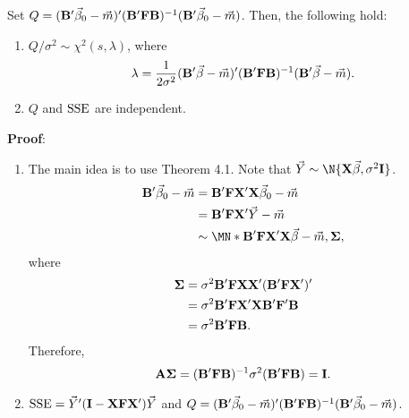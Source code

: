 \begin{Theorem}{}{}
    Set $ Q=(\mathbf{B}'\vec{\beta}_0-\vec{m})'(\mathbf{B}'\mathbf{F}\mathbf{B})^{-1}(\mathbf{B}'\vec{\beta}_0-\vec{m}) $.
    Then, the following hold:
    \begin{enumerate}[(1)]
        \item $ Q/\sigma^2 \sim \chi^2(s,\lambda) $, where
              \[ \lambda=\frac{1}{2\sigma^2}(\mathbf{B}'\vec{\beta}-\vec{m})'(\mathbf{B}'\mathbf{F}\mathbf{B})^{-1}(\mathbf{B}'\vec{\beta}-\vec{m}). \]
        \item $ Q $ and $ \text{SSE} $ are independent.
    \end{enumerate}
    \tcblower{}
    \textbf{Proof}:
    \begin{enumerate}[(1)]
        \item The main idea is to use Theorem 4.1.
              Note that $ \Vector{Y}\sim \N{\Matrix{X}\Vector{\beta},\sigma^2 \Matrix{I}} $.
              \begin{align*}
                  \Matrix{B}'\Vector{\beta}_0-\Vector{m}
                   & =\Matrix{B}'\Matrix{F}\Matrix{X}'\Matrix{X}\Vector{\beta}_0-\Vector{m}                         \\
                   & =\Matrix{B}'\Matrix{F}\Matrix{X}'\Vector{Y}-\Vector{m}                                         \\
                   & \sim\MN*{\Matrix{B}'\Matrix{F}\Matrix{X}'\Matrix{X}\Vector{\beta}-\Vector{m},\Matrix{\Sigma}},
              \end{align*}
              where
              \begin{align*}
                  \mathbf{\Sigma}
                   & =\sigma^2 \mathbf{B}'\mathbf{F}\mathbf{X}\mathbf{X}'(\mathbf{B}'\mathbf{F}\mathbf{X}')' \\
                   & =\sigma^2 \mathbf{B}'\mathbf{F}\mathbf{X}'\mathbf{X}\mathbf{B}'\mathbf{F}'\mathbf{B}    \\
                   & =\sigma^2 \mathbf{B}'\mathbf{F}\mathbf{B}.
              \end{align*}
              Therefore,
              \[ \mathbf{A}\mathbf{\Sigma}=(\mathbf{B}'\mathbf{F}\mathbf{B})^{-1}\sigma^2(\mathbf{B}'\mathbf{F}\mathbf{B})=\mathbf{I}. \]
        \item $ \text{SSE}=\vec{Y}'(\mathbf{I}-\mathbf{X}\mathbf{F}\mathbf{X}')\vec{Y} $ and
              $ Q=(\mathbf{B}'\vec{\beta}_0-\vec{m})'(\mathbf{B}'\mathbf{F}\mathbf{B})^{-1}(\mathbf{B}'\vec{\beta}_0-\vec{m}) $.

\end{enumerate}
\end{Theorem}
